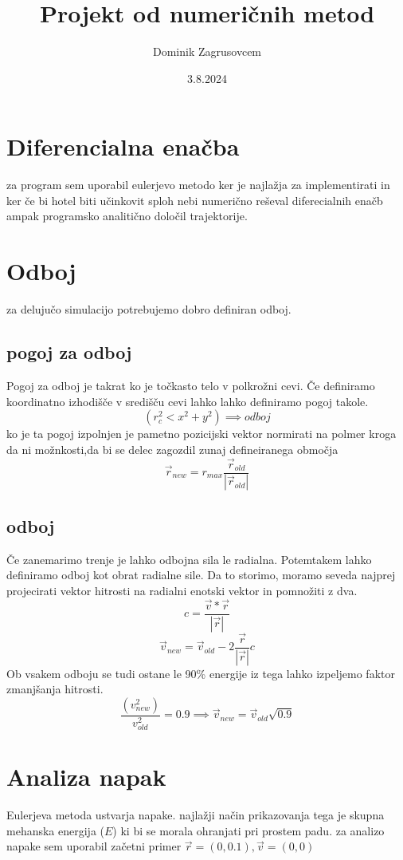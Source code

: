 \documentclass[]{report}   %
\begin{document}
\title{Projekt od numeričnih metod}   %
\author{Dominik Zagrusovcem}
\date{3.8.2024}    %
\maketitle
\section{Diferencialna enačba}
za program sem uporabil eulerjevo metodo ker je najlažja za implementirati in ker če bi hotel biti učinkovit sploh nebi numerično reševal diferecialnih enačb ampak programsko analitično določil trajektorije.
\section{Odboj}
za delujučo simulacijo potrebujemo dobro definiran odboj.
\subsection{pogoj za odboj}
Pogoj za odboj je takrat ko je točkasto telo v polkrožni cevi.
Če definiramo koordinatno izhodišče v središču cevi lahko lahko definiramo pogoj takole.
\[(r_c^2<x^2+y^2) \implies odboj \]
ko je ta pogoj izpolnjen je pametno pozicijski vektor normirati na polmer kroga da ni možnkosti,da bi se delec zagozdil zunaj defineiranega območja
\[
\vec{r}_{new}=r_{max}\frac{\vec{r}_{old}}{|\vec{r}_{old}|}
\]

\subsection{odboj}
Če zanemarimo trenje je lahko odbojna sila le radialna. Potemtakem lahko definiramo odboj kot obrat radialne sile.
Da to storimo, moramo seveda najprej projecirati vektor hitrosti na radialni enotski vektor in pomnožiti z dva.
\[
c = \frac{\vec{v} * \vec{r}}{|\vec{r}|}
\]
\[
\vec{v}_{new}= \vec{v}_{old}-2\frac{\vec{r}}{|\vec{r}|}c
\]
Ob vsakem odboju se tudi ostane le 90\% energije iz tega lahko izpeljemo faktor zmanjšanja hitrosti.
\[
\frac{(v_{new}^2)}{v_{old}^2}=0.9 \implies \vec{v}_{new}=\vec{v}_{old} \sqrt{0.9}
\]
\section{Analiza napak}
Eulerjeva metoda ustvarja napake. najlažji način prikazovanja tega je skupna mehanska energija ($E$) ki bi se morala ohranjati pri prostem padu. za analizo napake sem uporabil začetni primer $\vec{r}=(0,0.1),\vec{v}=(0,0)$ \newpage
\end{document}
